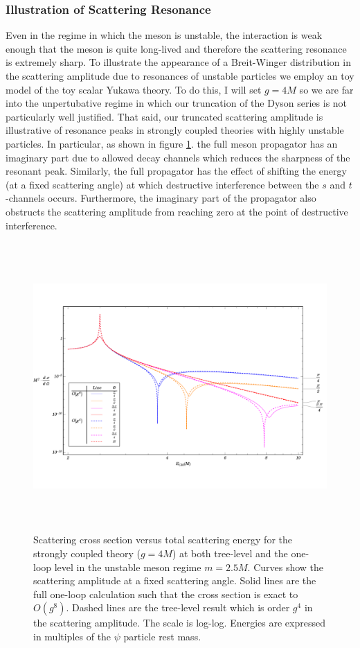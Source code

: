 \documentclass[12pt]{extarticle}
\begin{document}
\subsubsection{Illustration of Scattering Resonance}
Even in the regime in which the meson is unstable, the interaction is weak enough that the meson is quite long-lived and therefore the scattering resonance is extremely sharp. To illustrate the appearance of a Breit-Winger distribution in the scattering amplitude due to resonances of unstable particles we employ an toy model of the toy scalar Yukawa theory. To do this, I will set $g = 4 M$ so we are far into the unpertubative regime in which our truncation of the Dyson series is not particularly well justified. That said, our truncated scattering amplitude is illustrative of resonance peaks in strongly coupled theories with highly unstable particles. In particular, as shown in figure \ref{Ill}. the full meson propagator has an imaginary part due to allowed decay channels which reduces the sharpness of the resonant peak. Similarly, the full propagator has the effect of shifting the energy (at a fixed scattering angle) at which destructive interference between the $s$ and $t$-channels occurs. Furthermore, the imaginary part of the propagator also obstructs the scattering amplitude from reaching zero at the point of destructive interference.     
\begin{figure}
\begin{center}
\includegraphics[width=15cm, height=11cm]{UnStableMeson-Illustration}
\caption{Scattering cross section versus total scattering energy for the strongly coupled theory ($g = 4 M$) at both tree-level and the one-loop level in the unstable meson regime $m = 2.5 M$. Curves show the scattering amplitude at a fixed scattering angle. Solid lines are the full one-loop calculation such that the cross section is exact to $O(g^8)$. Dashed lines are the tree-level result which is order $g^4$ in the scattering amplitude. The scale is log-log. Energies are expressed in multiples of the $\psi$ particle rest mass.} 
\label{Ill}
\end{center}
\end{figure}
\end{document}
